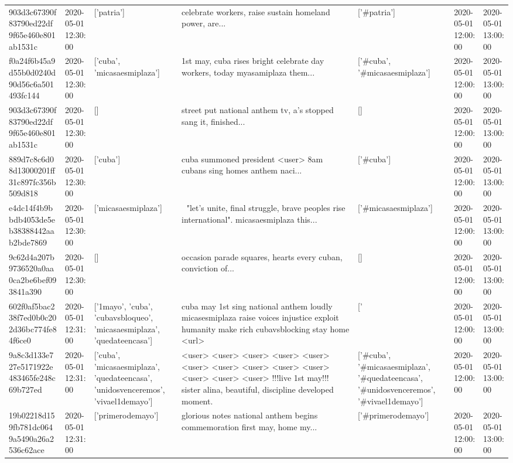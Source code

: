 \begin{tabular}{lllllll}
903d3c67390f83790ed22df9f65e460e801ab1531c & 2020-05-01 12:30:00 & ['patria'] & celebrate workers, raise sustain homeland power, are... & ['#patria'] & 2020-05-01 12:00:00 & 2020-05-01 13:00:00 \\
f0a24f6b45a9d55b0d0240d90d56c6a501493fc144 & 2020-05-01 12:30:00 & ['cuba', 'micasaesmiplaza'] & 1st may, cuba rises bright celebrate day workers, today myasamiplaza them... & ['#cuba', '#micasaesmiplaza'] & 2020-05-01 12:00:00 & 2020-05-01 13:00:00 \\
903d3c67390f83790ed22df9f65e460e801ab1531c & 2020-05-01 12:30:00 & [] & street put national anthem tv, a's stopped sang it, finished... & [] & 2020-05-01 12:00:00 & 2020-05-01 13:00:00 \\
889d7c8c6d08d13000201ff31c897fc356b509d818 & 2020-05-01 12:30:00 & ['cuba'] & cuba summoned president <user> 8am cubans sing homes anthem naci... & ['#cuba'] & 2020-05-01 12:00:00 & 2020-05-01 13:00:00 \\
e4dc14f4b9bbdb4053de5eb38388442aab2bde7869 & 2020-05-01 12:30:00 & ['micasaesmiplaza'] & 🎵 "let's unite, final struggle, brave peoples rise international". micasaesmiplaza this... & ['#micasaesmiplaza'] & 2020-05-01 12:00:00 & 2020-05-01 13:00:00 \\
9c62d4a207b9736520a0aa0ca2be6bef093841a390 & 2020-05-01 12:30:00 & [] & occasion parade squares, hearts every cuban, conviction of... & [] & 2020-05-01 12:00:00 & 2020-05-01 13:00:00 \\
602f0af5bac238f7ed0b0c202d36bc774fe84f6ce0 & 2020-05-01 12:31:00 & ['1mayo', 'cuba', 'cubavsbloqueo', 'micasaesmiplaza', 'quedateencasa'] & cuba may 1st sing national anthem loudly micasesmiplaza raise voices injustice exploit humanity make rich cubavsblocking stay home <url> & ['#1mayo', '#cuba', '#cubavsbloqueo', '#micasaesmiplaza', '#quedateencasa'] & 2020-05-01 12:00:00 & 2020-05-01 13:00:00 \\
9a8c3d133e727e5171922e483465fe248c69b727ed & 2020-05-01 12:31:00 & ['cuba', 'micasaesmiplaza', 'quedateencasa', 'unidosvenceremos', 'vivael1demayo'] & <user> <user> <user> <user> <user> <user> <user> <user> <user> <user> <user> <user> <user> !!!live 1st may!!! sister alina, beautiful, discipline developed moment. & ['#cuba', '#micasaesmiplaza', '#quedateencasa', '#unidosvenceremos', '#vivael1demayo'] & 2020-05-01 12:00:00 & 2020-05-01 13:00:00 \\
19b02218d159fb781dc0649a5490a26a2536c62ace & 2020-05-01 12:31:00 & ['primerodemayo'] & glorious notes national anthem begins commemoration first may, home my... & ['#primerodemayo'] & 2020-05-01 12:00:00 & 2020-05-01 13:00:00 \\

\end{tabular}
